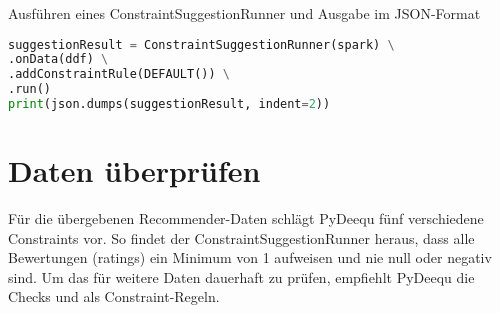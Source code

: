 \begin{code}
    \caption{Ausführen eines ConstraintSuggestionRunner und Ausgabe im JSON-Format}
    
    \begin{lstlisting}[language=Python]
suggestionResult = ConstraintSuggestionRunner(spark) \
.onData(ddf) \
.addConstraintRule(DEFAULT()) \
.run()
print(json.dumps(suggestionResult, indent=2))
\end{lstlisting}
\end{code}

\section{Daten überprüfen}

Für die übergebenen Recommender-Daten schlägt PyDeequ fünf verschiedene Constraints vor. So findet der ConstraintSuggestionRunner heraus, dass alle Bewertungen (ratings) ein Minimum von 1 aufweisen und nie null oder negativ sind. Um das für weitere Daten dauerhaft zu prüfen, empfiehlt PyDeequ die Checks  und  als Constraint-Regeln.

